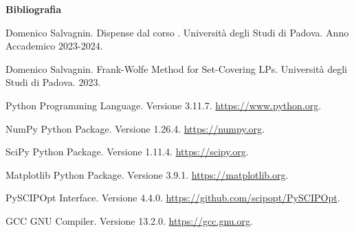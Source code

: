 {
\clearpage
\thispagestyle{empty}
\vspace*{10pt}
\begin{center}
\color{primary}
\fontsize{27pt}{0pt}\bfseries\selectfont\alt Bibliografia
\vspace*{10pt}
\end{center}
}

\begin{enumerate}[label={[\arabic*]}]
    \item Domenico Salvagnin. Dispense dal corso . Università
        degli Studi di Padova. Anno Accademico 2023-2024.
    \item Domenico Salvagnin. Frank-Wolfe Method for Set-Covering LPs. Università degli Studi di Padova. 2023.
    \item Python Programming Language. Versione 3.11.7. \url{https://www.python.org}.
    \item NumPy Python Package. Versione 1.26.4. \url{https://numpy.org}.
    \item SciPy Python Package. Versione 1.11.4. \url{https://scipy.org}.
    \item Matplotlib Python Package. Versione 3.9.1. \url{https://matplotlib.org}.
    \item PySCIPOpt Interface. Versione 4.4.0. \url{https://github.com/scipopt/PySCIPOpt}.
    \item GCC GNU Compiler. Versione 13.2.0. \url{https://gcc.gnu.org}.
\end{enumerate}
